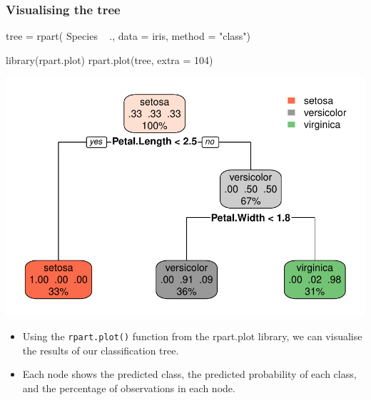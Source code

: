 \documentclass[a4paper]{article}\usepackage[]{graphicx}\usepackage[]{xcolor}
\makeatletter
\def\maxwidth{ %
  \ifdim\Gin@nat@width>\linewidth
    \linewidth
  \else
    \Gin@nat@width
  \fi
}
\makeatother
\begin{document}
\subsubsection{Visualising the tree}
\begin{Schunk}
\begin{Sinput}
tree = rpart(
  Species ~ .,
  data = iris,
  method = "class") 

library(rpart.plot)
rpart.plot(tree, extra = 104)
\end{Sinput}


{\centering \includegraphics[width=\maxwidth]{figure/listings-unnamed-chunk-428-1} 

}

\end{Schunk}
\begin{itemize}
	\item Using the \lstinline|rpart.plot()| function from the rpart.plot library, we can visualise the results of our classification tree.
	\item Each node shows the predicted class, the predicted probability of each class, and the percentage of observations in each node.
\end{itemize}
\end{document}
